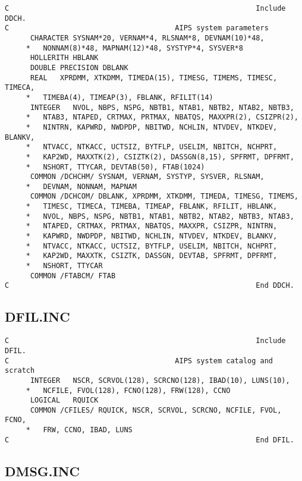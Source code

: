 \begin{verbatim}
C                                                          Include DDCH.
C                                       AIPS system parameters
      CHARACTER SYSNAM*20, VERNAM*4, RLSNAM*8, DEVNAM(10)*48,
     *   NONNAM(8)*48, MAPNAM(12)*48, SYSTYP*4, SYSVER*8
      HOLLERITH HBLANK
      DOUBLE PRECISION DBLANK
      REAL   XPRDMM, XTKDMM, TIMEDA(15), TIMESG, TIMEMS, TIMESC, TIMECA,
     *   TIMEBA(4), TIMEAP(3), FBLANK, RFILIT(14)
      INTEGER   NVOL, NBPS, NSPG, NBTB1, NTAB1, NBTB2, NTAB2, NBTB3,
     *   NTAB3, NTAPED, CRTMAX, PRTMAX, NBATQS, MAXXPR(2), CSIZPR(2),
     *   NINTRN, KAPWRD, NWDPDP, NBITWD, NCHLIN, NTVDEV, NTKDEV, BLANKV,
     *   NTVACC, NTKACC, UCTSIZ, BYTFLP, USELIM, NBITCH, NCHPRT,
     *   KAP2WD, MAXXTK(2), CSIZTK(2), DASSGN(8,15), SPFRMT, DPFRMT,
     *   NSHORT, TTYCAR, DEVTAB(50), FTAB(1024)
      COMMON /DCHCHM/ SYSNAM, VERNAM, SYSTYP, SYSVER, RLSNAM,
     *   DEVNAM, NONNAM, MAPNAM
      COMMON /DCHCOM/ DBLANK, XPRDMM, XTKDMM, TIMEDA, TIMESG, TIMEMS,
     *   TIMESC, TIMECA, TIMEBA, TIMEAP, FBLANK, RFILIT, HBLANK,
     *   NVOL, NBPS, NSPG, NBTB1, NTAB1, NBTB2, NTAB2, NBTB3, NTAB3,
     *   NTAPED, CRTMAX, PRTMAX, NBATQS, MAXXPR, CSIZPR, NINTRN,
     *   KAPWRD, NWDPDP, NBITWD, NCHLIN, NTVDEV, NTKDEV, BLANKV,
     *   NTVACC, NTKACC, UCTSIZ, BYTFLP, USELIM, NBITCH, NCHPRT,
     *   KAP2WD, MAXXTK, CSIZTK, DASSGN, DEVTAB, SPFRMT, DPFRMT,
     *   NSHORT, TTYCAR
      COMMON /FTABCM/ FTAB
C                                                          End DDCH.

\end{verbatim}
\subsection{DFIL.INC}

\begin{verbatim}
C                                                          Include DFIL.
C                                       AIPS system catalog and scratch
      INTEGER   NSCR, SCRVOL(128), SCRCNO(128), IBAD(10), LUNS(10),
     *   NCFILE, FVOL(128), FCNO(128), FRW(128), CCNO
      LOGICAL   RQUICK
      COMMON /CFILES/ RQUICK, NSCR, SCRVOL, SCRCNO, NCFILE, FVOL, FCNO,
     *   FRW, CCNO, IBAD, LUNS
C                                                          End DFIL.

\end{verbatim}
\subsection{DMSG.INC}

